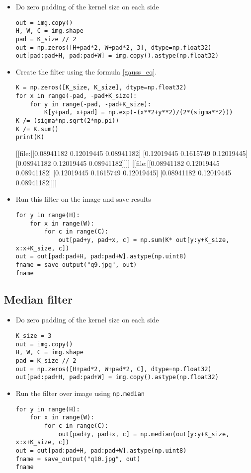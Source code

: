 \documentclass[letterpaper, 11pt]{article}
\begin{document}
\begin{itemize}
\item Do zero padding of the kernel size on each side
\begin{verbatim}
out = img.copy()
H, W, C = img.shape
pad = K_size // 2
out = np.zeros([H+pad*2, W+pad*2, 3], dtype=np.float32)
out[pad:pad+H, pad:pad+W] = img.copy().astype(np.float32)
\end{verbatim}

\item Create the filter using the formula \ref{gauss_eq}.
\begin{verbatim}
K = np.zeros([K_size, K_size], dtype=np.float32)
for x in range(-pad, -pad+K_size):
    for y in range(-pad, -pad+K_size):
        K[y+pad, x+pad] = np.exp(-(x**2+y**2)/(2*(sigma**2)))
K /= (sigma*np.sqrt(2*np.pi))
K /= K.sum()
print(K)
\end{verbatim}
[[file:[[0.08941182 0.12019445 0.08941182]
 [0.12019445 0.1615749  0.12019445]
 [0.08941182 0.12019445 0.08941182]]]]
[[file:[[0.08941182 0.12019445 0.08941182]
 [0.12019445 0.1615749  0.12019445]
 [0.08941182 0.12019445 0.08941182]]]]
\item Run this filter on the image and save results
\begin{verbatim}
for y in range(H):
    for x in range(W):
        for c in range(C):
            out[pad+y, pad+x, c] = np.sum(K* out[y:y+K_size, x:x+K_size, c])
out = out[pad:pad+H, pad:pad+W].astype(np.uint8)
fname = save_output("q9.jpg", out)
fname
\end{verbatim}
\end{itemize}
\subsection{Median filter}
\label{sec:orgcfc4a66}
\begin{itemize}
\item Do zero padding of the kernel size on each side
\begin{verbatim}
K_size = 3
out = img.copy()
H, W, C = img.shape
pad = K_size // 2
out = np.zeros([H+pad*2, W+pad*2, C], dtype=np.float32)
out[pad:pad+H, pad:pad+W] = img.copy().astype(np.float32)
\end{verbatim}
\item Run the filter over image using \texttt{np.median}
\begin{verbatim}
for y in range(H):
    for x in range(W):
        for c in range(C):
            out[pad+y, pad+x, c] = np.median(out[y:y+K_size, x:x+K_size, c])
out = out[pad:pad+H, pad:pad+W].astype(np.uint8)
fname = save_output("q10.jpg", out)
fname
\end{verbatim}
\end{itemize}
\end{document}
